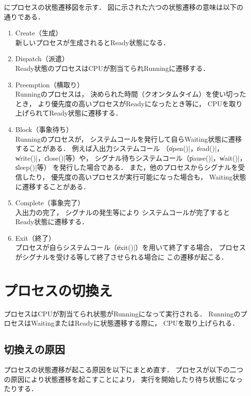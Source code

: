 にプロセスの状態遷移図を示す．
図に示された六つの状態遷移の意味は以下の通りである．

\begin{enumerate}
\item Create（生成） \\
新しいプロセスが生成されるとReady状態になる．

\item Dispatch（派遣） \\
Ready状態のプロセスはCPUが割当てられRunningに遷移する．

\item Preemption（横取り） \\
Runningのプロセスは，
決められた時間（クオンタムタイム）を使い切ったとき，
より優先度の高いプロセスがReadyになったとき等に，
CPUを取り上げられてReady状態に遷移する．

\item Block（事象待ち） \\
Runningのプロセスが，
システムコールを発行して自らWaiting状態に遷移することがある．
例えば入出力システムコール
（\|open()|，\|read()|，\|write()|，\|close()|等）や，
シグナル待ちシステムコール（\|pause()|，\|wait()|，\|sleep()|等）
を発行した場合である．
また，他のプロセスからシグナルを受信したり，
優先度の高いプロセスが実行可能になった場合も，
Waiting状態に遷移することがある．

\item Complete（事象完了） \\
入出力の完了，
シグナルの発生等により
システムコールが完了するとReady状態に遷移する．

\item Exit（終了） \\
プロセスが自らシステムコール（\|exit()|）を用いて終了する場合，
プロセスがシグナルを受ける等して終了させられる場合に
この遷移が起こる．
\end{enumerate}


\section{プロセスの切換え}
プロセスはCPUが割当てられ状態がRunningになって実行される．
RunningのプロセスはWaitingまたはReadyに状態遷移する際に，
CPUを取り上げられる．

\subsection{切換えの原因}
プロセスの状態遷移が起こる原因を以下にまとめ直す．
プロセスが以下の二つの原因により状態遷移を起こすことにより，
実行を開始したり待ち状態になったりする．

